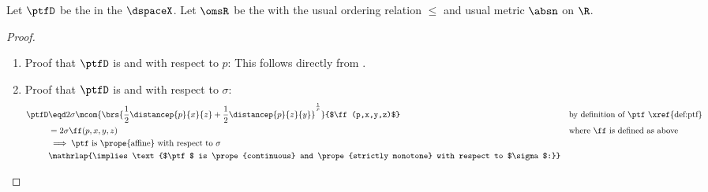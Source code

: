 \begin{corollary}
\label{cor:tri_mono}
Let $\ptfD$ be the   in the   $\dspaceX$.
Let $\omsR$ be the  with the usual ordering relation $\le$ and usual metric $\absn$ on $\R$.
\end{corollary}
\begin{proof}
\begin{enumerate}
  \item Proof that $\ptfD$ is  and  with respect to $p$: This follows directly from .
  \item Proof that $\ptfD$ is  and  with respect to $\sigma$:
    \begin{align*}
      \ptfD
        &\eqd 2\sigma\mcom{\brs{\frac{1}{2}\distancep{p}{x}{z} + \frac{1}{2}\distancep{p}{z}{y}}^\frac{1}{p}}{$\ff(p,x,y,z)$}
        && \text{by definition of $\ptf$ \xref{def:ptf}}
      \\&=  2\sigma\ff(p,x,y,z)
        && \text{where $\ff$ is defined as above}
      \\&\implies\text{$\ptf$ is \prope{affine} with respect to $\sigma$}
      \\&\mathrlap{\implies\text{$\ptf$ is \prope{continuous} and \prope{strictly monotone} with respect to $\sigma$:}}
    \end{align*}
\end{enumerate}
\end{proof}

